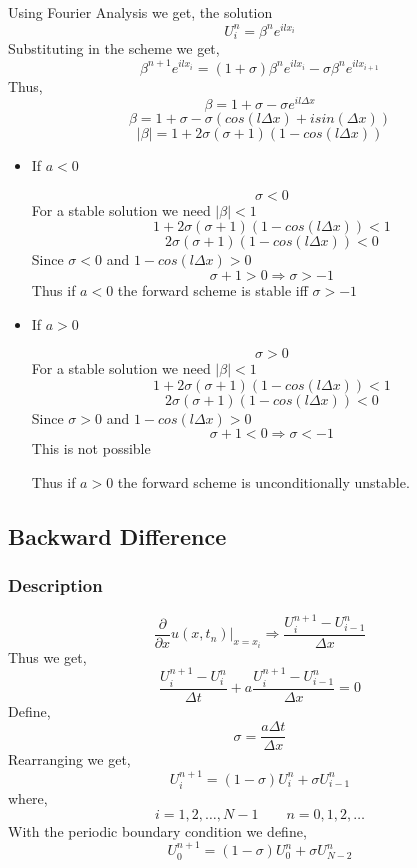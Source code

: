 \documentclass[11pt]{article}
\begin{document}
Using Fourier Analysis we get, the solution
$$U_i^n = \beta^n e^{i l x_i}$$
Substituting in the scheme we get,
$$\beta^{n+1} e^{i l x_i} = \left( 1 + \sigma \right) \beta^n e^{i l x_i} - \sigma \beta^n e^{i l x_{i+1}}$$
Thus,
$$\beta = 1 + \sigma - \sigma e^{i l \Delta x}$$
$$\beta = 1 + \sigma - \sigma \left( cos(l \Delta x) + i sin(\Delta x) \right)$$
$$\lvert \beta \rvert = 1 + 2 \sigma \left( \sigma +1 \right) \left( 1 - cos(l \Delta x) \right)$$

\begin{itemize}
\item If \(a<0\)

$$\sigma < 0$$
For a stable solution we need \(\lvert \beta \rvert < 1\)
$$1 + 2 \sigma \left( \sigma +1 \right) \left( 1 - cos(l \Delta x) \right) <1$$
$$2 \sigma \left( \sigma +1 \right) \left( 1 - cos(l \Delta x) \right) <0$$
Since \(\sigma <0\) and \(1 - cos(l \Delta x) > 0\)
$$\sigma + 1 > 0 \Rightarrow \sigma > -1$$
Thus if \(a<0\) the forward scheme is stable iff \(\sigma > -1\)

\item If \(a>0\)

$$\sigma > 0$$
For a stable solution we need \(\lvert \beta \rvert < 1\)
$$1 + 2 \sigma \left( \sigma +1 \right) \left( 1 - cos(l \Delta x) \right) <1$$
$$2 \sigma \left( \sigma +1 \right) \left( 1 - cos(l \Delta x) \right) <0$$
Since \(\sigma >0\) and \(1 - cos(l \Delta x) > 0\)
$$\sigma + 1<0 \Rightarrow \sigma < -1$$
This is not possible

Thus if \(a>0\) the forward scheme is unconditionally unstable.
\end{itemize}
\subsection{Backward Difference}
\label{sec:org7518942}
\subsubsection{Description}
\label{sec:org8271bcc}
$$\frac{\partial}{\partial x} u(x,t_n) \bigg|_{x=x_i} \Rightarrow \frac{U_i^{n+1} - U_{i-1}^n}{\Delta x}$$
Thus we get,
$$\frac{U_i^{n+1} - U_i^n}{\Delta t} + a \frac{U_i^{n+1} - U_{i-1}^n}{\Delta x} = 0$$
Define,
$$\sigma = \frac{a \Delta t}{\Delta x}$$
Rearranging we get,
$$U_i^{n+1} = \left( 1 - \sigma \right) U_i^n + \sigma U_{i-1}^n$$
where,
$$i=1,2,\ldots,N-1 \qquad n = 0,1,2,\ldots$$
With the periodic boundary condition we define,
$$U_{0}^{n+1} = \left( 1 - \sigma \right) U_{0}^n + \sigma U_{N-2}^n$$
\end{document}
